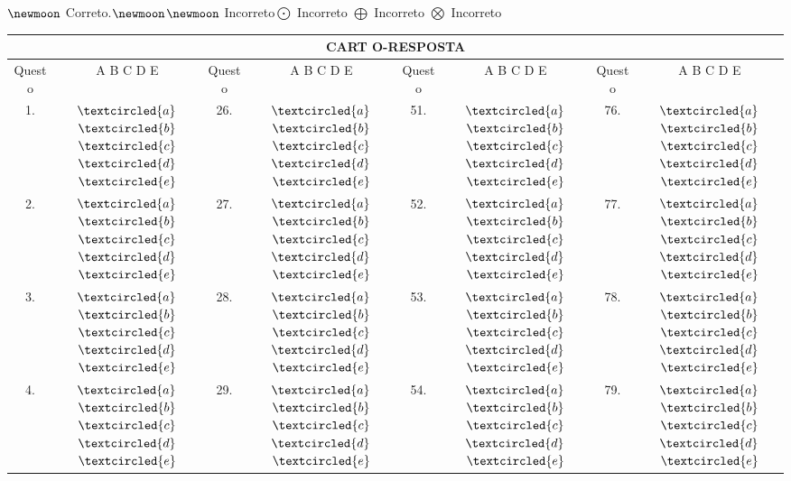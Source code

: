 \documentclass{article}
\begin{document}
$\newmoon$ Correto.\hspace{2.5cm}$\newmoon$$\newmoon$ Incorreto\hspace{2.5cm}$\bigodot$ Incorreto\hspace{2.5cm} $\bigoplus$ Incorreto\hspace{2.5cm} $\bigotimes$ Incorreto
\Large
\begin{center}
\begin{tabular}{ |c|c|c|c|c|c|c|c|}
 \hline
 \multicolumn{8}{|c|}{\vspace*{1cm}\LARGE{\textbf{CART O-RESPOSTA}}}\\
 \hline
 \centering Quest o &  A B C D E &Quest o &  A B C D E&Quest o&A B C D E&Quest o&A B C D E\\
 \hline
 1. & $\textcircled{a}$$\textcircled{b}$$\textcircled{c}$$\textcircled{d}$$\textcircled{e}$&26.&$\textcircled{a}$$\textcircled{b}$$\textcircled{c}$$\textcircled{d}$$\textcircled{e}$&51.&$\textcircled{a}$$\textcircled{b}$$\textcircled{c}$$\textcircled{d}$$\textcircled{e}$&76.&$\textcircled{a}$$\textcircled{b}$$\textcircled{c}$$\textcircled{d}$$\textcircled{e}$ \\
2. & $\textcircled{a}$$\textcircled{b}$$\textcircled{c}$$\textcircled{d}$$\textcircled{e}$&27.&$\textcircled{a}$$\textcircled{b}$$\textcircled{c}$$\textcircled{d}$$\textcircled{e}$&52.&$\textcircled{a}$$\textcircled{b}$$\textcircled{c}$$\textcircled{d}$$\textcircled{e}
$&77.&$\textcircled{a}$$\textcircled{b}$$\textcircled{c}$$\textcircled{d}$$\textcircled{e}$ \\
 3. & $\textcircled{a}$$\textcircled{b}$$\textcircled{c}$$\textcircled{d}$$\textcircled{e}$&28.&$\textcircled{a}$$\textcircled{b}$$\textcircled{c}$$\textcircled{d}$$\textcircled{e}$&53.&$\textcircled{a}$$\textcircled{b}$$\textcircled{c}$$\textcircled{d}$$\textcircled{e}$&78.&$\textcircled{a}$$\textcircled{b}$$\textcircled{c}$$\textcircled{d}$$\textcircled{e}$ \\
4. & $\textcircled{a}$$\textcircled{b}$$\textcircled{c}$$\textcircled{d}$$\textcircled{e}$&29.&$\textcircled{a}$$\textcircled{b}$$\textcircled{c}$$\textcircled{d}$$\textcircled{e}$&54.&$\textcircled{a}$$\textcircled{b}$$\textcircled{c}$$\textcircled{d}$$\textcircled{e}$&79.&$\textcircled{a}$$\textcircled{b}$$\textcircled{c}$$\textcircled{d}$$\textcircled{e}$ \\

\end{tabular}
\end{center}$$
\end{document}
